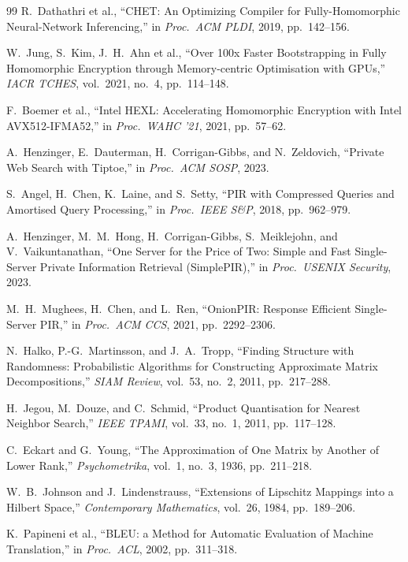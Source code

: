 \documentclass[11pt,a4paper]{article}
\begin{document}
\begin{thebibliography}{99}
 R.\ Dathathri et al., ``CHET: An Optimizing Compiler
for Fully-Homomorphic Neural-Network Inferencing,'' in
\emph{Proc.\ ACM PLDI}, 2019, pp.\ 142--156.

 W.\ Jung, S.\ Kim, J.\ H.\ Ahn et al.,
``Over 100x Faster Bootstrapping in Fully Homomorphic Encryption
through Memory-centric Optimisation with GPUs,'' \emph{IACR TCHES},
vol.\ 2021, no.\ 4, pp.\ 114--148.

 F.\ Boemer et al., ``Intel HEXL: Accelerating
Homomorphic Encryption with Intel AVX512-IFMA52,'' in
\emph{Proc.\ WAHC '21}, 2021, pp.\ 57--62.

 A.\ Henzinger, E.\ Dauterman, H.\ Corrigan-Gibbs,
and N.\ Zeldovich, ``Private Web Search with Tiptoe,'' in
\emph{Proc.\ ACM SOSP}, 2023.

 S.\ Angel, H.\ Chen, K.\ Laine, and S.\ Setty,
``PIR with Compressed Queries and Amortised Query Processing,'' in
\emph{Proc.\ IEEE S\&P}, 2018, pp.\ 962--979.

 A.\ Henzinger, M.\ M.\ Hong, H.\ Corrigan-Gibbs,
S.\ Meiklejohn, and V.\ Vaikuntanathan, ``One Server for the Price of
Two: Simple and Fast Single-Server Private Information Retrieval
(SimplePIR),'' in \emph{Proc.\ USENIX Security}, 2023.

 M.\ H.\ Mughees, H.\ Chen, and L.\ Ren,
``OnionPIR: Response Efficient Single-Server PIR,'' in
\emph{Proc.\ ACM CCS}, 2021, pp.\ 2292--2306.

 N.\ Halko, P.-G.\ Martinsson, and J.\ A.\ Tropp,
``Finding Structure with Randomness: Probabilistic Algorithms for
Constructing Approximate Matrix Decompositions,'' \emph{SIAM Review},
vol.\ 53, no.\ 2, 2011, pp.\ 217--288.

 H.\ Jegou, M.\ Douze, and C.\ Schmid, ``Product
Quantisation for Nearest Neighbor Search,'' \emph{IEEE TPAMI},
vol.\ 33, no.\ 1, 2011, pp.\ 117--128.

 C.\ Eckart and G.\ Young, ``The Approximation of
One Matrix by Another of Lower Rank,'' \emph{Psychometrika}, vol.\ 1,
no.\ 3, 1936, pp.\ 211--218.

 W.\ B.\ Johnson and J.\ Lindenstrauss, ``Extensions
of Lipschitz Mappings into a Hilbert Space,'' \emph{Contemporary
Mathematics}, vol.\ 26, 1984, pp.\ 189--206.

 K.\ Papineni et al., ``BLEU: a Method for Automatic
Evaluation of Machine Translation,'' in \emph{Proc.\ ACL}, 2002,
pp.\ 311--318.


\end{thebibliography}
\end{document}
